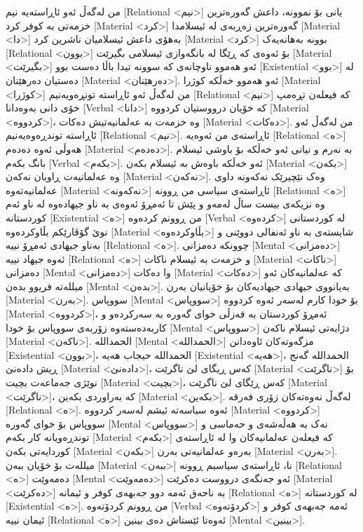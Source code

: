من لەگەڵ ئەو ئاڕاستەیە نیم [Relational <نیم>] یانی بۆ نموونە، داعش گەورەترین خزمەتی بە کوفر کرد [Material <کرد>] گەورەترین زەڕبەی لە ئیسلامدا [Material <دا>] بەهۆی داعش ئیسلامیان ناشرین کرد [Material <کرد>] بوونە بەهانەیەک [Relational <بوون>] بۆ ئەوەی کە ڕێگا لە بانگەوازی ئیسلامی بگیرێت [Material <بگیرێت>] ئەو هەموو ناوچانەی کە سوونە تیدا باڵا دەست بوو [Existential <بوو>] لە دەستیان دەرهێنان [Material <دەرهێنان>]. ئەو هەموو خەڵکە کوژرا [Material <کوژرا>] من لەگەڵ ئەو ئاڕاستە تونڕەویەنیم [Relational <نیم>] کە فیعلەن تڕەمپ خۆی دانی بەوەدانا [Verbal <دانا>] کە خۆیان درووستیان کردووە [Material <کردووە>]، وە خزمەت بە عەلمانیەتیش دەکات [Material <دەکات>]. من لەگەڵ ئەو ئاڕاستە توندڕەوەیەنیم [Relational <نیم>].
ئاڕاستەی من ئەوەیە [Relational <ە>] هەوڵی ئەوە دەدەم [Material <دەدەم>].
بە نەرم و نیانی ئەو خەڵکە بۆ باوشی ئیسلام بانگ بکەم [Verbal <بکەم>]. ئەو خەڵکە باوەش بە ئیسلام بکەن [Material <بکەن>] وە عەلمانیەت ڕاویان نەکەن [Material <نەکەن>]. وەک نێچیرێک نەکەونە داوی عەلمانیەتەوە [Material <نەکەونە>] ئاڕاستەی سیاسی من ڕوونە [Relational <ە>] وە نزیکەی بیست ساڵ لەمەو و پێش تا ئەمڕۆ ئەوەی بە ناو جیهادەوە لە ناو ئەم کوردستانە [Existential <ە>] من ڕوونم کردەوە [Verbal <کردەوە>] لە کوردستانی نوێ گۆڤارێکم بڵاوکردەوە [Material <بڵاوکردەوە>] شایستەی بە ناو ئەنفالی دووێنی و بەناو جیهادی ئەمڕۆ نییە [Relational <ە>]. چوونکە دەمزانی [Mental <دەمزانی>] ئەوە جیهاد نییە [Relational <ە>] و خزمەت بە ئیسلام ناکات [Material <ناکات>] دەمزانی [Mental <دەمزانی>] وا دەکات [Material <دەکات>] کە عەلمانیەکان ئەو میللەتە فریوو بدەن [Mental <بدەن>].
بەیانووی جیهادی جیهادیەکان بۆ خۆیانیان بەرن [Material <بەرن>]. سووپاس [Mental <سووپاس>] بۆ خودا کارم لەسەر ئەوە کردووە [Material <کردووە>]، ئەمڕۆ کوردستان بە فەزڵی خوای گەورە بە سەرکردەو و کاربەدەستەوە زۆربەی سووپاس بۆ خودا [Mental <سووپاس>] دژایەتی ئیسلام ناکەن [Material <ناکەن>]. الحمداللە [Mental <الحمداللە>] مزگەوتەکان ئاوەدانن [Existential <بوون>]، الحمدالله حیجاب هەیە [Existential <هەیە>]، الحمداللە گەنج ڕیش دادەنێ [Material <دادەنێ>]، کەس ڕیگای لێ ناگرێت [Material <ناگرێت>] بۆ نوێژی جەماعەت بچیت [Material <بچیت>]، کەس ڕێگای لێ ناگرێت [Material <ناگرێت>]، کە بەراوردی بکەین [Material <بکەین>].
لەگەڵ نەوەتەکان زۆری فەرقە [Relational <ە>]. ئەوە سیاسەتە ئیشم لەسەر کردووە [Material <کردووە>] سووپاس بۆ خوای گەورە [Mental <سووپاس>] نەک بە هەڵەشەی و حەماسی و توندڕەویانە کار بکەم [Material <بکەم>] کە فیعلەن عەلمانیەکان وا لە ئاڕاستەی کوردایەتی بکەن [Material <بکەن>] بەرەو عەلمانیەتی بەرن [Material <بەرن>]. میللەت بۆ خۆیان ببەن [Material <ببەن>] نا، ئاڕاستەی سیاسیم ڕوونە [Relational <ە>] دەمەوێت [Mental <دەمەوێت>] ئەو جەنگەی درووست دەکرێت [Material <دەکرێت>] بە ناحەق ئەمە دوو جەبهەی کوفر و ئیمانە [Relational <ە>] لە کوردستانە [Existential <ە>]. من ڕوونم کردۆتەوە [Verbal <کردۆتەوە>] ئەمە جەبهەی کوفر و ئیمان نییە [Relational <ە>] ئەوەتا ئێستاش دەی بینین [Mental <بینین>].
